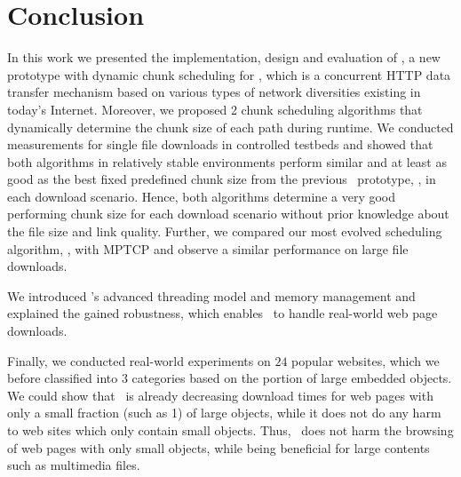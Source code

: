 \chapter{Conclusion}
\label{ch:conclusion}









In this work we presented the implementation, design and evaluation of \protonew, \ie a new prototype with dynamic chunk scheduling for \mhttp, which is a concurrent HTTP data transfer mechanism based on various types of network diversities existing in today’s Internet.
Moreover, we proposed 2 chunk scheduling algorithms that dynamically determine the chunk size of each path during runtime. 
We conducted measurements for single file downloads in controlled testbeds and showed that both algorithms in relatively stable environments perform similar and at least as good as the best fixed predefined chunk size from the previous \mhttp~prototype, \ie \protoold, in each download scenario. 
Hence, both algorithms determine a very good performing chunk size for each download scenario without prior knowledge about the file size and link quality. 
Further, we compared our most evolved scheduling algorithm, \ie \algslice, with MPTCP and observe a similar performance on large file downloads. 

We introduced \protonew's advanced threading model and memory management and explained the gained robustness, which enables \protonew~to handle real-world web page downloads.

Finally, we conducted real-world experiments on $24$ popular websites, which we before classified into $3$ categories based on the portion of large embedded objects. 
We could show that \mhttp~is already decreasing download times for web pages with only a small fraction (such as 1\perc) of large objects, while it does not do any harm to web sites which only contain small objects. 
Thus, \mhttp~does not harm the browsing of web pages with only small objects, while being beneficial for large contents such as multimedia files. 
